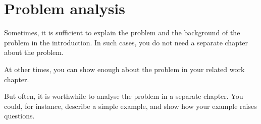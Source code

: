 \chapter{Problem analysis}
Sometimes, it is sufficient to explain the problem and the background of the problem in the introduction. In such cases, you do not need a separate chapter about the problem.

At other times, you can show enough about the problem in your related work chapter.

But often, it is worthwhile to analyse the problem in a separate chapter. You could, for instance, describe a simple example, and show how your example raises questions.
